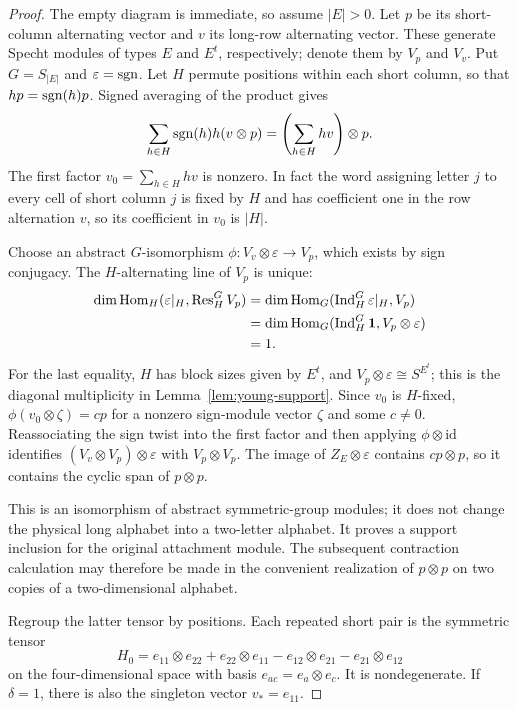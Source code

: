 \begin{proof}
The empty diagram is immediate, so assume $|E|>0$.
Let $p$ be its short-column alternating vector and $v$ its
long-row alternating vector.  These generate Specht modules of
types $E$ and $E^t$, respectively; denote them by
$V_p$ and $V_v$.  Put $G=S_{|E|}$ and $\varepsilon=\operatorname{sgn}$.
Let $H$ permute
positions within each short column, so that $hp=\operatorname{sgn}(h)p$.
Signed averaging of the product gives
\[
 \sum_{h\in H}\operatorname{sgn}(h)h(v\otimes p)
       =\left(\sum_{h\in H}hv\right)\otimes p.
\]
The first factor $v_0=\sum_{h\in H}hv$ is nonzero.  In fact the
word assigning letter $j$ to every cell of short column $j$ is
fixed by $H$ and has coefficient one in the row alternation $v$,
so its coefficient in $v_0$ is $|H|$.

Choose an abstract $G$-isomorphism
$\phi:V_v\otimes\varepsilon\longrightarrow V_p$, which exists
by sign conjugacy.  The $H$-alternating line of $V_p$ is unique:
\begin{align*}
 \dim\operatorname{Hom}_H(\varepsilon|_H,\operatorname{Res}_H^G V_p)
 &=\dim\operatorname{Hom}_G(\operatorname{Ind}_H^G\varepsilon|_H,V_p)\\
 &=\dim\operatorname{Hom}_G(\operatorname{Ind}_H^G\mathbf1,V_p\otimes\varepsilon)\\
 &=1.
\end{align*}
For the last equality, $H$ has block sizes given by $E^t$, and
$V_p\otimes\varepsilon\cong S^{E^t}$; this is the diagonal
multiplicity in Lemma~\ref{lem:young-support}.
Since $v_0$ is $H$-fixed,
$\phi(v_0\otimes\zeta)=cp$ for a nonzero sign-module vector
$\zeta$ and some $c\ne0$.  Reassociating the sign twist into
the first factor and then applying $\phi\otimes\mathrm{id}$
identifies $(V_v\otimes V_p)\otimes\varepsilon$ with
$V_p\otimes V_p$.  The image of $Z_E\otimes\varepsilon$
contains $cp\otimes p$, so it contains the cyclic span of
$p\otimes p$.

This is an isomorphism of abstract symmetric-group modules; it
does not change the physical long alphabet into a two-letter
alphabet.  It proves a support inclusion for the original
attachment module.  The subsequent contraction calculation may
therefore be made in the convenient realization of $p\otimes p$
on two copies of a two-dimensional alphabet.

Regroup the latter tensor by positions.  Each repeated short pair
is the symmetric tensor
\begin{equation}\label{eq:band-pair-form}
 H_0=e_{11}\otimes e_{22}+e_{22}\otimes e_{11}
       -e_{12}\otimes e_{21}-e_{21}\otimes e_{12}
\end{equation}
on the four-dimensional space with basis
$e_{ac}=e_a\otimes e_c$.  It is nondegenerate.  If $\delta=1$,
there is also the singleton vector $v_*=e_{11}$.


\end{proof}
